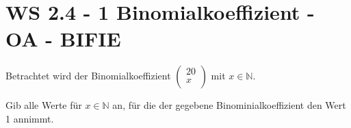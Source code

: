 \section{WS 2.4 - 1 Binomialkoeffizient - OA - BIFIE}

\begin{beispiel}[WS 2.4]{1}
Betrachtet wird der Binomialkoeffizient $\begin{pmatrix}20 \\
x\\ \end{pmatrix}$ mit $x \in \mathbb{N}.$ \leer

Gib alle Werte für $x \in \mathbb{N}$ an, für die der gegebene Binominialkoeffizient den Wert 1 annimmt. 

\end{beispiel}